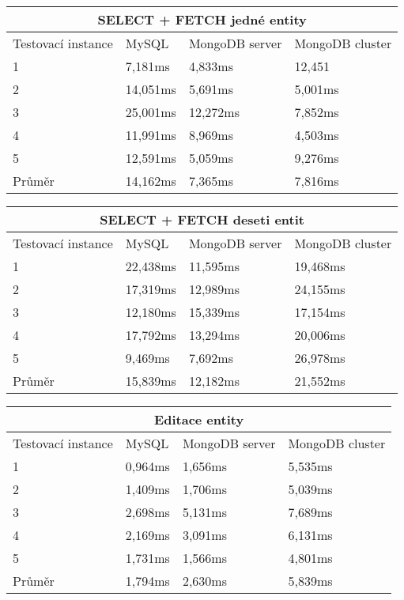 \begin{table}[h]
\centering
\begin{tabular}{ | l | l | l | l | }
\hline
\multicolumn{4}{|c|}{SELECT + FETCH jedné entity} \\ \hline
Testovací instance &MySQL&MongoDB server & MongoDB cluster \\ \hline
1 & 7,181ms & 4,833ms & 12,451 \\ \hline
2 & 14,051ms & 5,691ms & 5,001ms \\ \hline
3 & 25,001ms & 12,272ms & 7,852ms \\ \hline
4 & 11,991ms & 8,969ms & 4,503ms \\ \hline
5 & 12,591ms & 5,059ms & 9,276ms \\ \hline
Průměr & 14,162ms & 7,365ms & 7,816ms \\ \hline
\end{tabular}
\end{table}

\begin{table}[h]
\centering
\begin{tabular}{ | l | l | l | l | }
\hline
\multicolumn{4}{|c|}{SELECT + FETCH deseti entit} \\ \hline
Testovací instance &MySQL&MongoDB server & MongoDB cluster \\ \hline
1 & 22,438ms & 11,595ms & 19,468ms \\ \hline
2 & 17,319ms & 12,989ms & 24,155ms \\ \hline
3 & 12,180ms & 15,339ms & 17,154ms \\ \hline
4 & 17,792ms & 13,294ms & 20,006ms \\ \hline
5 & 9,469ms & 7,692ms & 26,978ms \\ \hline
Průměr & 15,839ms & 12,182ms & 21,552ms \\ \hline
\end{tabular}
\end{table}

\begin{table}[h]
\centering
\begin{tabular}{ | l | l | l | l | }
\hline
\multicolumn{4}{|c|}{Editace entity} \\ \hline
Testovací instance &MySQL&MongoDB server & MongoDB cluster \\ \hline
1 & 0,964ms & 1,656ms & 5,535ms \\ \hline
2 & 1,409ms & 1,706ms & 5,039ms \\ \hline
3 & 2,698ms & 5,131ms & 7,689ms \\ \hline
4 & 2,169ms & 3,091ms & 6,131ms \\ \hline
5 & 1,731ms & 1,566ms & 4,801ms \\ \hline
Průměr & 1,794ms & 2,630ms & 5,839ms \\ \hline
\end{tabular}
\end{table}

